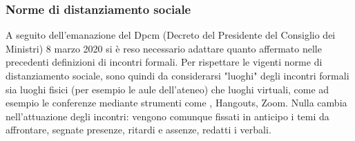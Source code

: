 \subsubsection{Norme di distanziamento sociale}
A seguito dell'emanazione del Dpcm (Decreto del Presidente del Consiglio dei Ministri) 8 marzo 2020 si è reso necessario adattare quanto affermato nelle precedenti definizioni di incontri formali.
Per rispettare le vigenti norme di distanziamento sociale, sono quindi da considerarsi "luoghi" degli incontri formali sia luoghi fisici (per esempio le aule dell'ateneo) che luoghi virtuali, come ad esempio le conferenze mediante strumenti come , Hangouts, Zoom.
Nulla cambia nell'attuazione degli incontri: vengono comunque fissati in anticipo i temi da affrontare, segnate presenze, ritardi e assenze, redatti i verbali.

